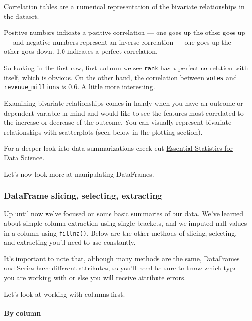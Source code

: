 \documentclass[11pt]{article}
\begin{document}
    Correlation tables are a numerical representation of the bivariate
relationships in the dataset.

Positive numbers indicate a positive correlation --- one goes up the
other goes up --- and negative numbers represent an inverse correlation
--- one goes up the other goes down. 1.0 indicates a perfect
correlation.

So looking in the first row, first column we see \texttt{rank} has a
perfect correlation with itself, which is obvious. On the other hand,
the correlation between \texttt{votes} and \texttt{revenue\_millions} is
0.6. A little more interesting.

Examining bivariate relationships comes in handy when you have an
outcome or dependent variable in mind and would like to see the features
most correlated to the increase or decrease of the outcome. You can
visually represent bivariate relationships with scatterplots (seen below
in the plotting section).

For a deeper look into data summarizations check out
\href{https://www.learndatasci.com/tutorials/data-science-statistics-using-python/}{Essential
Statistics for Data Science}.

Let's now look more at manipulating DataFrames.

    \hypertarget{dataframe-slicing-selecting-extracting}{%
\subsubsection{DataFrame slicing, selecting,
extracting}\label{dataframe-slicing-selecting-extracting}}

Up until now we've focused on some basic summaries of our data. We've
learned about simple column extraction using single brackets, and we
imputed null values in a column using \texttt{fillna()}. Below are the
other methods of slicing, selecting, and extracting you'll need to use
constantly.

It's important to note that, although many methods are the same,
DataFrames and Series have different attributes, so you'll need be sure
to know which type you are working with or else you will receive
attribute errors.

Let's look at working with columns first.

    \hypertarget{by-column}{%
\paragraph{By column}\label{by-column}}
\end{document}
